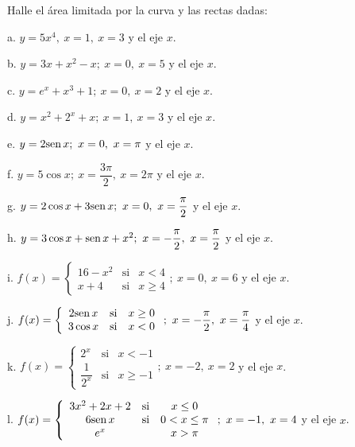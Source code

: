 

\begin{ejer}{Halle el área limitada por la curva y las rectas dadas:}


a. $y=5x^{4},\ x=1,\ x=3$ y el eje $x$.


b. $y=3x+x^{2}-x;\ x=0,\ x=5$ y el eje $x$.


c. $y=e^{x}+x^{3}+1;\ x=0,\ x=2$ y el eje $x$.


d. $y=x^{2}+2^{x}+x;\ x=1,\ x=3$ y el eje $x$.


e. $y=2\text{\rm sen}\, x;\ x=0,\ x=\pi$ y el eje $x$.


f. $y=5\cos x;\ x=\dfrac{3\pi}{2},\ x=2\pi$ y el eje $x$.


g. $y=2\cos x+3\sen x;\ x=0,\ x=\dfrac{\pi}{2}$ y el eje $x$.


h. $y=3\cos x+\sen x+x^{2};\ x=-\dfrac{\pi}{2},\ x=\dfrac{\pi}{2}$ y el eje $x$.


i. $f(x)=\left\{
\begin{array}{ccc}
16-x^{2} & \text{si} & x<4 \\
x+4 & \text{si} & x\geq 4
\end{array}
\right.;\ x=0,\ x=6$ y el eje $x$.


j. $f(x)=\left\{
\begin{array}{ccc}
2\text{\rm sen}\, x & \text{si} & x\geq 0 \\
3\cos x & \text{si} & x<0
\end{array}
\right.;\ x=-\dfrac{\pi}{2},\ x=\dfrac{\pi}{4}$ y el eje $x$.


k. $f(x)=\left\{
\begin{array}{ccc}
2^{x} & \text{si} & x<-1 \\
\dfrac{1}{2^{x}} & \text{si} & x\geq -1
\end{array}
\right.;\ x=-2,\ x=2$ y el eje $x$.


l. $f(x)=\left\{
\begin{array}{ccc}
3x^{2}+2x+2 & \text{si} & x\leq 0 \\
6\text{\rm sen}\, x & \text{si} & 0<x\leq \pi \\
e^{x} & & x>\pi
\end{array}
\right.;\ x=-1,\ x=4$ y el eje $x$.
\end{ejer}
